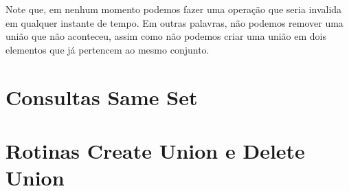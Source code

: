 Note que, em nenhum momento podemos fazer uma operação que seria invalida em qualquer instante de tempo. Em outras palavras, não podemos remover uma união que não aconteceu, assim como não podemos criar uma união em dois elementos que já pertencem ao mesmo conjunto.

\section{Consultas Same Set}
\label{sec:uf-same-set}


\section{Rotinas Create Union e Delete Union}
\label{sec:uf-union}